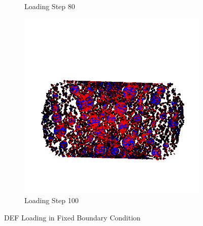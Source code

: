 \begin{figure}[ht]
\begin{subfigure}{.33\textwidth}
      \caption{Loading Step 80}
    \end{subfigure}%
    \begin{subfigure}{.33\textwidth}
      \centering
      \includegraphics[width=1.0\linewidth]{Files/A30X-5C_3_IS/DEP50-STEP(120).png}
      \caption{Loading Step 100}
    \end{subfigure}

  \caption{DEF Loading in Fixed Boundary Condition}
  \label{fig:DEF_Loading}
\end{figure}


